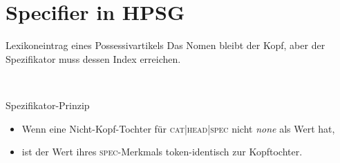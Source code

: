 \section{Specifier in HPSG}

\begin{frame}
  {Lexikoneintrag eines Possessivartikels}
  \onslide<+->
  \onslide<+->
  Das Nomen bleibt der Kopf, aber \alert{der Spezifikator muss dessen Index erreichen}.\\
  \onslide<+->
  \Zeile
  \begin{minipage}{0.45\textwidth}
  \end{minipage}~\onslide<+->%
  \begin{minipage}{0.5\textwidth}
    \alert{Spezifikator-Prinzip}\\
    \Halbzeile 
    \begin{itemize}[<+->]
      \item Wenn eine Nicht-Kopf-Tochter für \textsc{cat|head|spec} nicht \textit{none} als Wert hat,
      \item ist der Wert ihres \textsc{spec}-Merkmals token-identisch zur Kopftochter.
    \end{itemize}
  \end{minipage}
\end{frame}

